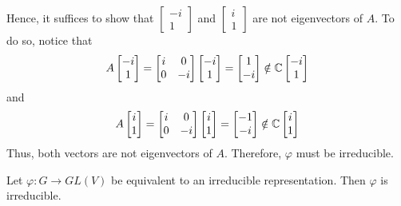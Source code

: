 \begin{solution}
    Hence, it suffices to show that $\begin{bmatrix}-i \\ 1 \end{bmatrix}$ and $\begin{bmatrix}i \\ 1 \end{bmatrix}$ are not eigenvectors of $A$. To do so, notice that
    $$A\begin{bmatrix}-i \\ 1 \end{bmatrix} = \begin{bmatrix}i & 0 \\ 0 & -i\end{bmatrix}\begin{bmatrix}-i \\ 1 \end{bmatrix} = \begin{bmatrix}1 \\ -i \end{bmatrix} \notin \mathbb{C} \begin{bmatrix}-i \\ 1 \end{bmatrix}$$
    and 
    $$A\begin{bmatrix}i \\ 1 \end{bmatrix} = \begin{bmatrix}i & 0 \\ 0 & -i\end{bmatrix}\begin{bmatrix}i \\ 1 \end{bmatrix} = \begin{bmatrix}-1 \\ -i \end{bmatrix} \notin \mathbb{C} \begin{bmatrix}i \\ 1 \end{bmatrix}$$
    Thus, both vectors are not eigenvectors of $A$. Therefore, $\varphi$ must be irreducible. \\
\end{solution}

\begin{exercise}
    Let $\varphi : G \to GL(V)$ be equivalent to an irreducible representation. Then $\varphi$ is irreducible. \\
\end{exercise}

